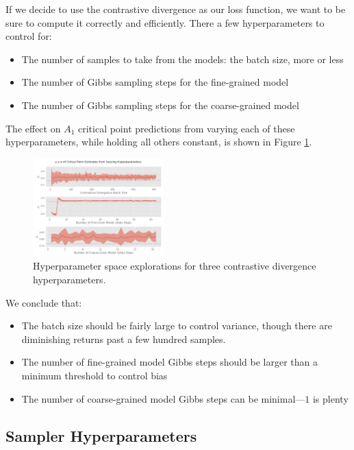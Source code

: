 \documentclass[%
    reprint,
    amsmath,amssymb,
    aps,
]{revtex4-2}
\begin{document}
If we decide to use the contrastive divergence as our loss function, we want to be sure to compute it correctly and efficiently. 
There a few hyperparameters to control for: 
\begin{itemize}
    \item The number of samples to take from the models: the batch size, more or less
    \item The number of Gibbs sampling steps for the fine-grained model
    \item The number of Gibbs sampling steps for the coarse-grained model
\end{itemize}
The effect on $A_1$ critical point predictions from varying each of these hyperparameters, while holding all others constant, is shown in Figure \ref{fig:cd-hyperparameters}.

\begin{figure}[h]
    \includegraphics[width=0.45\textwidth]{tex/images/cd-hyperparameters.png}
    \caption{\label{fig:cd-hyperparameters}
        Hyperparameter space explorations for three contrastive divergence hyperparameters. 
    }
\end{figure}

We conclude that:
\begin{itemize}
    \item The batch size should be fairly large to control variance, though there are diminishing returns past a few hundred samples. 
    \item The number of fine-grained model Gibbs steps should be larger than a minimum threshold to control bias
    \item The number of coarse-grained model Gibbs steps can be minimal—$1$ is plenty
\end{itemize}

\subsection{Sampler Hyperparameters} \label{sec:sampler-hyperparameters}
\end{document}

